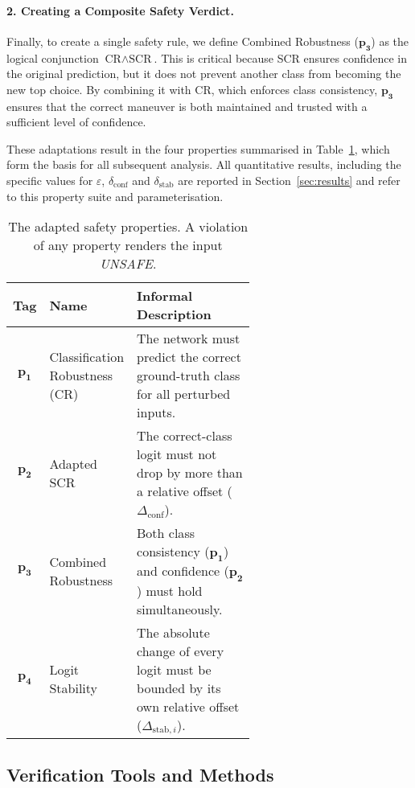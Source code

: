 \paragraph{2. Creating a Composite Safety Verdict.}
Finally, to create a single safety rule, we define Combined Robustness (\(\mathbf{p_3}\)) as the logical conjunction \(\text{CR}\wedge\text{SCR}\). This is critical because SCR ensures confidence in the original prediction, but it does not prevent another class from becoming the new top choice. By combining it with CR, which enforces class consistency, \(\mathbf{p_3}\) ensures that the correct maneuver is both maintained and trusted with a sufficient level of confidence.


These adaptations result in the four properties summarised in Table~\ref{tab:prop-defs}, which form the basis for all subsequent analysis. All quantitative results, including the specific values for \(\varepsilon\), \(\delta_{\text{conf}}\) and \(\delta_{\text{stab}}\) are reported in Section~\ref{sec:results} and refer to this property suite and parameterisation.

\begin{table}[ht]
    \centering
    \caption{The adapted safety properties. A violation of any property renders the input \textit{UNSAFE}.\label{tab:prop-defs}}
    \begin{tabular}{clp{0.6\linewidth}}
        \toprule
        Tag & Name & Informal Description \\ \midrule
        $\mathbf{p_1}$ & Classification Robustness (CR) & The network must predict the correct ground-truth class for all perturbed inputs. \\[4pt]
        $\mathbf{p_2}$ & Adapted SCR & The correct-class logit must not drop by more than a relative offset ($\Delta_{\text{conf}}$). \\[4pt]
        $\mathbf{p_3}$ & Combined Robustness & Both class consistency (\(\mathbf{p_1}\)) and confidence (\(\mathbf{p_2}\)) must hold simultaneously. \\[4pt]
        $\mathbf{p_4}$ & Logit Stability & The absolute change of every logit must be bounded by its own relative offset ($\Delta_{\text{stab},i}$). \\
        \bottomrule
    \end{tabular}
\end{table}


  \subsection{Verification Tools and Methods}
  
